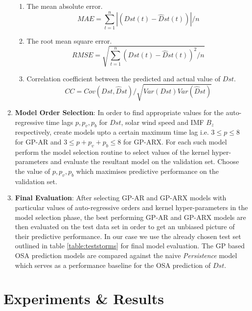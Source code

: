 \documentclass{article}
\begin{document}
\begin{enumerate}
\begin{enumerate}
    \item The mean absolute error.
    \begin{equation}
        MAE = \sum_{t=1}^{n} \left |(Dst(t) - \hat{D}st(t)) \right | / n
    \end{equation}
    \item The root mean square error.
    \begin{equation}
        RMSE = \sqrt{\sum_{t=1}^{n} (Dst(t) - \hat{D}st(t))^2 / n}
    \end{equation}
    \item Correlation coefficient between the predicted and actual value of $Dst$.
    \begin{equation}
        CC = Cov(Dst, \hat{D}st)/\sqrt{Var(Dst) Var(\hat{D}st)}
    \end{equation}
\end{enumerate}


\item \textbf{Model Order Selection}: In order to find appropriate values for the auto-regressive time lags $p, p_v, p_b$ for $Dst$, solar wind speed and IMF $B_z$ respectively, create models upto a certain maximum time lag i.e. $3 \leq p \leq 8$ for GP-AR and $3 \leq p + p_v + p_b \leq 8$ for GP-ARX. For each such model perform the model selection routine to select values of the kernel hyper-parameters and evaluate the resultant model on the validation set. Choose the value of $p, p_v, p_b$ which maximises predictive performance on the validation set.

\item \textbf{Final Evaluation}: After selecting GP-AR and GP-ARX models with particular values of auto-regressive orders and kernel hyper-parameters in the model selection phase, the best performing GP-AR and GP-ARX models are then evaluated on the test data set in order to get an unbiased picture of their predictive performance. In our case we use the already chosen test set outlined in table \ref{table:teststorms} for final model evaluation. The GP based OSA prediction models are compared against the naive \emph{Persistence} model which serves as a performance baseline for the OSA prediction of $Dst$.

\end{enumerate}

\section{Experiments \& Results}
\end{document}
